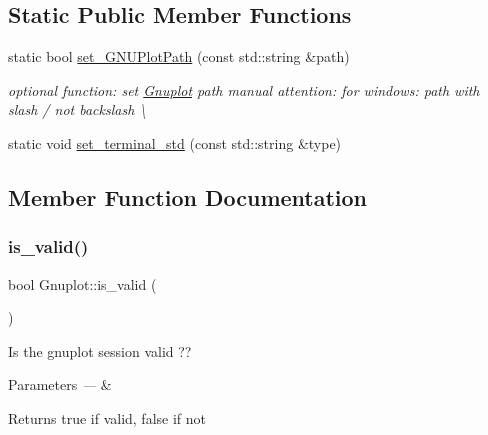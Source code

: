 \subsection*{Static Public Member Functions}
\begin{DoxyCompactItemize}
\item 
static bool \mbox{\hyperlink{class_gnuplot_a67cae885c26ced821e335d98986f1967}{set\+\_\+\+G\+N\+U\+Plot\+Path}} (const std\+::string \&path)
\begin{DoxyCompactList}\small\item\em optional function\+: set \mbox{\hyperlink{class_gnuplot}{Gnuplot}} path manual attention\+: for windows\+: path with slash \textquotesingle{}/\textquotesingle{} not backslash \textquotesingle{}\textbackslash{}\textquotesingle{} \end{DoxyCompactList}\item 
static void \mbox{\hyperlink{class_gnuplot_a21feba7a3916708b742c3dc25850ab2f}{set\+\_\+terminal\+\_\+std}} (const std\+::string \&type)
\end{DoxyCompactItemize}


\subsection{Member Function Documentation}
\mbox{\label{class_gnuplot_a3135ffebb308b50c4f3178a62b23ab03}} 
\subsubsection{\texorpdfstring{is\+\_\+valid()}{is\_valid()}}
{\footnotesize\ttfamily bool Gnuplot\+::is\+\_\+valid (\begin{DoxyParamCaption}{ }\end{DoxyParamCaption})\hspace{0.3cm}{\ttfamily [inline]}}



Is the gnuplot session valid ?? 


\begin{DoxyParams}{Parameters}
{\em ---} & \\
\hline
\end{DoxyParams}
\begin{DoxyReturn}{Returns}
true if valid, false if not 
\end{DoxyReturn}
\mbox{\label{class_gnuplot_afb69631c7a498077e378a3cbb56f38c8}} 
